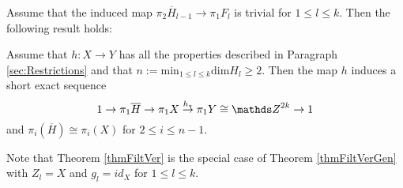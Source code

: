Assume that the induced map $\pi_2 \overline{H}_{l-1}\rightarrow \pi_1 F_l$ is trivial for $1\leq l\leq k$. Then the following result holds:

\begin{theorem}
 Assume that $h:X\rightarrow Y$ has all the properties described in Paragraph \ref{sec:Restrictions} and that $n:= \mathrm{min}_{1\leq l \leq k} \mathrm{dim} H_l\geq 2$. Then the map $h$ induces a short exact sequence
 \[
  1\rightarrow \pi_1 \overline{H}\rightarrow \pi_1 X \stackrel{h_{\ast}}{\rightarrow} \pi_1 Y \cong \ZZ^{2k} \rightarrow 1
 \] 
and $\pi_i(\overline{H})\cong \pi_i (X)$ for $2\leq i \leq n-1$.
\label{thmFiltVerGen}
\end{theorem}

Note that Theorem \ref{thmFiltVer} is the special case of Theorem \ref{thmFiltVerGen} with $Z_l=X$ and $g_l=id_X$ for $1\leq l \leq k$.


